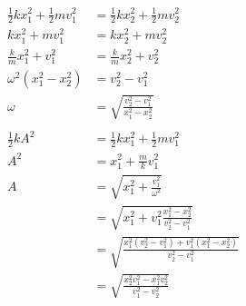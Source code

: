 \documentclass{article}
\begin{document}
\begin{align*}
  \frac{1}{2} k x_1^2 + \frac{1}{2} m v_1^2 & = \frac{1}{2} k x_2^2 + \frac{1}{2} m v_2^2                                  \\
  k x_1^2 + m v_1^2                         & = k x_2^2 + m v_2^2                                                          \\
  \frac{k}{m} x_1^2 + v_1^2                 & = \frac{k}{m} x_2^2 + v_2^2                                                  \\
  \omega^2 (x_1^2 - x_2^2)                  & = v_2^2 - v_1^2                                                              \\
  \omega                                    & = \sqrt{\frac{v_2^2 - v_1^2}{x_1^2 - x_2^2}}                                 \\ \\
  \frac{1}{2} k A^2                         & = \frac{1}{2} k x_1^2 + \frac{1}{2} m v_1^2                                  \\
  A^2                                       & = x_1^2 + \frac{m}{k} v_1^2                                                  \\
  A                                         & = \sqrt{x_1^2 + \frac{v_1^2}{\omega^2}}                                      \\
                                            & = \sqrt{x_1^2 + v_1^2 \frac{x_1^2 - x_2^2}{v_2^2 - v_1^2}}                   \\
                                            & = \sqrt{\frac{x_1^2 (v_2^2 - v_1^2) + v_1^2 (x_1^2 - x_2^2)}{v_2^2 - v_1^2}} \\
                                            & = \sqrt{\frac{x_2^2 v_1^2 - x_1^2 v_2^2}{v_1^2 - v_2^2}}
\end{align*}

\setcounter{subsection}{12}
\subsection{}
\end{document}
